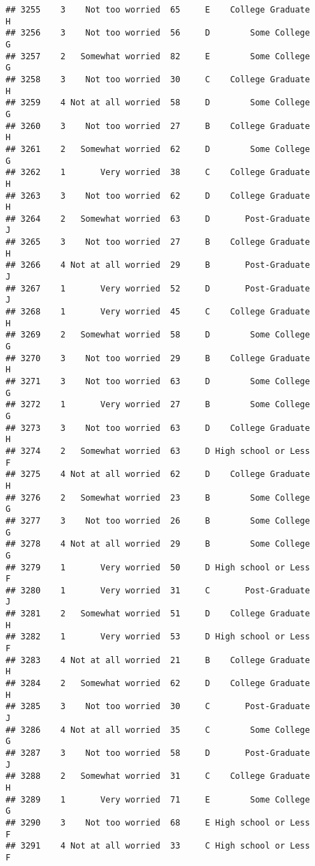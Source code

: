 \documentclass[
]{article}
\begin{document}
\begin{verbatim}
## 3255    3    Not too worried  65     E    College Graduate         H
## 3256    3    Not too worried  56     D        Some College         G
## 3257    2   Somewhat worried  82     E        Some College         G
## 3258    3    Not too worried  30     C    College Graduate         H
## 3259    4 Not at all worried  58     D        Some College         G
## 3260    3    Not too worried  27     B    College Graduate         H
## 3261    2   Somewhat worried  62     D        Some College         G
## 3262    1       Very worried  38     C    College Graduate         H
## 3263    3    Not too worried  62     D    College Graduate         H
## 3264    2   Somewhat worried  63     D       Post-Graduate         J
## 3265    3    Not too worried  27     B    College Graduate         H
## 3266    4 Not at all worried  29     B       Post-Graduate         J
## 3267    1       Very worried  52     D       Post-Graduate         J
## 3268    1       Very worried  45     C    College Graduate         H
## 3269    2   Somewhat worried  58     D        Some College         G
## 3270    3    Not too worried  29     B    College Graduate         H
## 3271    3    Not too worried  63     D        Some College         G
## 3272    1       Very worried  27     B        Some College         G
## 3273    3    Not too worried  63     D    College Graduate         H
## 3274    2   Somewhat worried  63     D High school or Less         F
## 3275    4 Not at all worried  62     D    College Graduate         H
## 3276    2   Somewhat worried  23     B        Some College         G
## 3277    3    Not too worried  26     B        Some College         G
## 3278    4 Not at all worried  29     B        Some College         G
## 3279    1       Very worried  50     D High school or Less         F
## 3280    1       Very worried  31     C       Post-Graduate         J
## 3281    2   Somewhat worried  51     D    College Graduate         H
## 3282    1       Very worried  53     D High school or Less         F
## 3283    4 Not at all worried  21     B    College Graduate         H
## 3284    2   Somewhat worried  62     D    College Graduate         H
## 3285    3    Not too worried  30     C       Post-Graduate         J
## 3286    4 Not at all worried  35     C        Some College         G
## 3287    3    Not too worried  58     D       Post-Graduate         J
## 3288    2   Somewhat worried  31     C    College Graduate         H
## 3289    1       Very worried  71     E        Some College         G
## 3290    3    Not too worried  68     E High school or Less         F
## 3291    4 Not at all worried  33     C High school or Less         F

\end{verbatim}
\end{document}

